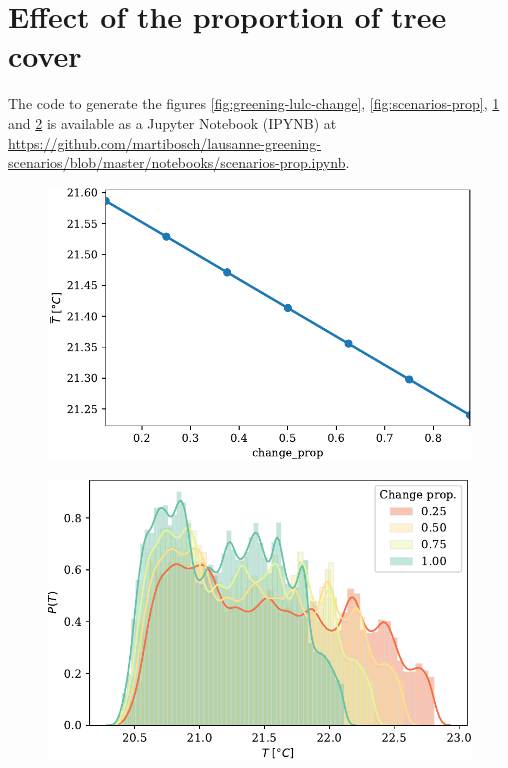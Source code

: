 \documentclass[12pt]{iopart}
\begin{document}


\section{Effect of the proportion of tree cover}
\label{sec:effect-prop}

The code to generate the figures \ref{fig:greening-lulc-change}, \ref{fig:scenarios-prop}, \ref{fig:scenarios-prop-regplot} and \ref{fig:scenarios-prop-hists} is available as a Jupyter Notebook (IPYNB) at \url{https://github.com/martibosch/lausanne-greening-scenarios/blob/master/notebooks/scenarios-prop.ipynb}.

\begin{figure}[ht]
  \centering
  \includegraphics[width=.6\textwidth]{figures/scenarios-prop-regplot}
  \caption{\label{fig:scenarios-prop-regplot}}
\end{figure}


\begin{figure}[ht]
  \centering
  \includegraphics[width=.6\textwidth]{figures/scenarios-prop-hists}
  \caption{\label{fig:scenarios-prop-hists}}
\end{figure}
\end{document}
